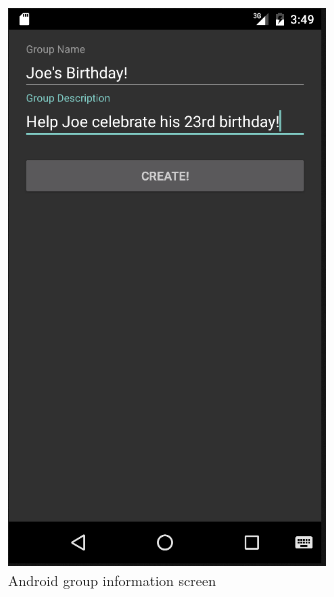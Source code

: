 	\begin{figure}[tbh]
	\begin{center}
	\includegraphics[width=0.75\textwidth]{AndroidPictures/groupCreatePage.png}
	\end{center}
	\caption{Android group information screen \label{AndroidGroupInfo}}
	\end{figure}


